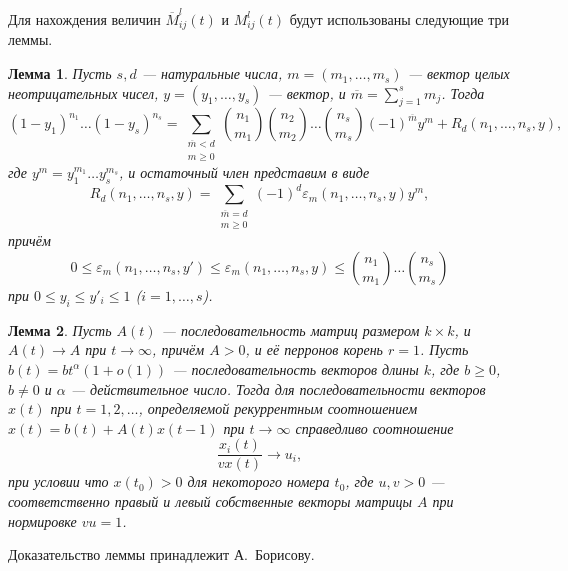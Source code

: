 \documentclass[12pt]{article}
\renewcommand{\leq}{\leqslant}
\renewcommand{\geq}{\geqslant}
\renewcommand{\epsilon}{\varepsilon}
\newtheorem{lemma}{Лемма}
\begin{document}
Для нахождения величин $\overline{M}^l_{ij}(t)$ и $M^l_{ij}(t)$ будут использованы следующие три леммы.

\begin{lemma}
\label{l:first}
	\cite{sevast-processes} Пусть $s, d$ --- натуральные числа, $m = (m_1, \ldots, m_s)$ --- вектор целых неотрицательных чисел, $y = (y_1, \ldots, y_s)$ --- вектор, и $\overline{m} = \sum_{j = 1}^s m_j$. Тогда
	\begin{equation*}
		(1 - y_1)^{n_1} \ldots (1 - y_s)^{n_s} = \sum_{\substack{\overline{m} < d \\ m \geq 0}} \binom{n_1}{m_1} \binom{n_2}{m_2} \ldots \binom{n_s}{m_s} (-1)^{\overline{m}} y^m + R_d(n_1, \ldots, n_s, y),
	\end{equation*}
	где $y^m = y_1^{m_1} \ldots y_s^{m_s}$, и остаточный член представим в виде
	\begin{equation*}
		R_d(n_1, \ldots, n_s, y) = \sum_{\substack{\overline{m} = d \\ m \geq 0}} (-1)^d \epsilon_m(n_1, \ldots, n_s, y) y^m,
	\end{equation*}
	причём
	\begin{equation*}
		0 \leq \epsilon_m(n_1, \ldots, n_s, y') \leq \epsilon_m(n_1, \ldots, n_s, y) \leq \binom{n_1}{m_1} \ldots \binom{n_s}{m_s}
	\end{equation*}
	при $0 \leq y_i \leq y'_i \leq 1$ ($i = 1,\ldots,s$).
\end{lemma}

\begin{lemma}
\label{l:Ab}
	Пусть $A(t)$ --- последовательность матриц размером $k \times k$, и $A(t) \rightarrow A$ при $t \rightarrow \infty$, причём $A > 0$, и её перронов корень $r = 1$. Пусть $b(t) = b t^\alpha (1 + o(1))$ --- последовательность векторов длины $k$, где $b \geq 0$, $b \neq 0$ и $\alpha$ --- действительное число. Тогда для последовательности векторов $x(t)$ при $t = 1, 2, \ldots$, определяемой рекуррентным соотношением $x(t) = b(t) + A(t) x(t-1)$ при $t \rightarrow \infty$ справедливо соотношение
	\begin{equation*}
		\frac{x_i(t)}{v x(t)} \rightarrow u_i,
	\end{equation*}
	при условии что $x(t_0) > 0$ для некоторого номера $t_0$, где $u, v > 0$ --- соответственно правый и левый собственные векторы матрицы $A$ при нормировке $vu = 1$.
\end{lemma}
Доказательство леммы принадлежит А.~Борисову.
\end{document}
